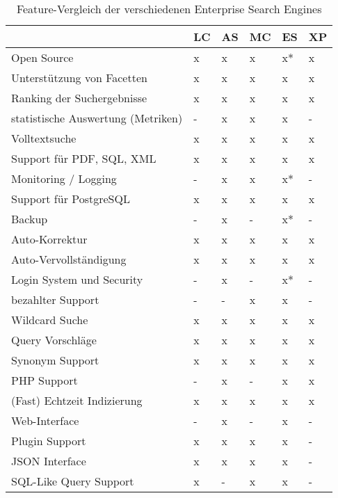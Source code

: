 \begin{table} %
	\centering
		\begin{tabular}{l | l | l | l | l | l}
		& \textbf{LC} & \textbf{AS} & \textbf{MC} & \textbf{ES}  & \textbf{XP} \\
        \hline
        Open Source                                 & x & x & x & x* & x \\
        Unterstützung von Facetten                  & x & x & x & x  & x \\
        Ranking der Suchergebnisse                  & x & x & x & x  & x \\
        statistische Auswertung (Metriken)          & - & x & x & x  & - \\
        Volltextsuche                               & x & x & x & x  & x \\
        Support für PDF, SQL, XML                   & x & x & x & x  & x \\
        Monitoring / Logging                        & - & x & x & x* & - \\
        Support für PostgreSQL                      & x & x & x & x  & x \\
        Backup                                      & - & x & - & x* & - \\
        Auto-Korrektur                              & x & x & x & x  & x \\
        Auto-Vervollständigung                      & x & x & x & x  & x \\
        Login System und Security                   & - & x & - & x* & - \\
        bezahlter Support                           & - & - & x & x  & - \\
        Wildcard Suche                              & x & x & x & x  & x \\
        Query Vorschläge                            & x & x & x & x  & x \\
        Synonym Support                             & x & x & x & x  & x \\
        PHP Support                                 & - & x & - & x  & x \\
        (Fast) Echtzeit Indizierung                 & x & x & x & x  & x \\
        Web-Interface                               & - & x & - & x  & - \\
        Plugin Support                              & x & x & x & x  & - \\
        JSON Interface                              & x & x & x & x  & - \\
        SQL-Like Query Support                      & x & - & x & x  & - \\
		\end{tabular}
	\caption{Feature-Vergleich der verschiedenen Enterprise Search Engines}
    \label{vglTable}


\end{table}
